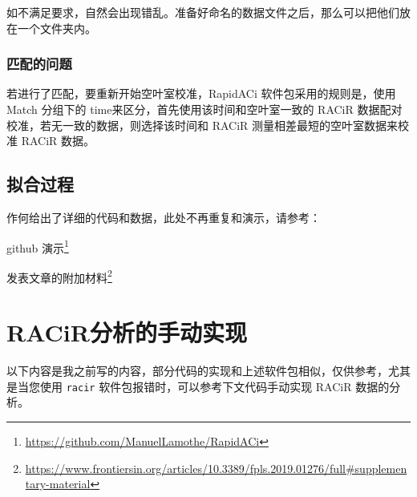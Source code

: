 \documentclass[
]{krantz}
\renewcommand{\href}[2]{#2\footnote{\url{#1}}}
\begin{document}
如不满足要求，自然会出现错乱。准备好命名的数据文件之后，那么可以把他们放在一个文件夹内。

\hypertarget{match-time}{%
\subsubsection{匹配的问题}\label{match-time}}

若进行了匹配，要重新开始空叶室校准，RapidACi 软件包采用的规则是，使用 Match 分组下的 time来区分，首先使用该时间和空叶室一致的 RACiR 数据配对校准，若无一致的数据，则选择该时间和 RACiR 测量相差最短的空叶室数据来校准 RACiR 数据。

\hypertarget{conifer-racir-fit}{%
\subsection{拟合过程}\label{conifer-racir-fit}}

作何给出了详细的代码和数据，此处不再重复和演示，请参考：

\href{https://github.com/ManuelLamothe/RapidACi}{github 演示}

\href{https://www.frontiersin.org/articles/10.3389/fpls.2019.01276/full\#supplementary-material}{发表文章的附加材料}

\cleardoublepage

\hypertarget{racir68_exam}{%
\section{\texorpdfstring{RACiR\texttrademark 分析的手动实现}{RACiR分析的手动实现}}\label{racir68_exam}}

以下内容是我之前写的内容，部分代码的实现和上述软件包相似，仅供参考，尤其是当您使用 \texttt{racir} 软件包报错时，可以参考下文代码手动实现 RACiR 数据的分析。
\end{document}
